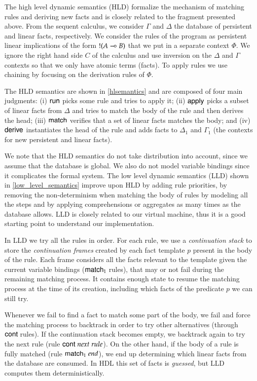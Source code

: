 The high level dynamic semantics (HLD) formalize the mechanism of matching rules and deriving new facts and is closely related to the fragment presented above.
From the sequent calculus, we consider $\Gamma$ and $\Delta$ the database of persistent and linear facts, respectively.
We consider the rules of the program as persistent linear implications of the form ${!} (A \multimap B)$ that we put in a separate context $\Phi$.
We ignore the right hand side $C$ of the calculus and use inversion on the $\Delta$ and $\Gamma$ contexts so that we only have atomic terms (facts). To apply rules
we use chaining by focusing on the derivation rules of $\Phi$.

The HLD semantics are shown in \ref{hlsemantics} and are composed of four main judgments: (i) $\mathsf{run}$ picks some rule and tries to apply it;
(ii) $\mathsf{apply}$ picks a subset of linear facts from $\Delta$ and tries to match the body of the rule and then derives the head; (iii) $\mathsf{match}$
verifies that a set of linear facts matches the body; and (iv) $\mathsf{derive}$ instantiates the head of the rule and adds facts to $\Delta_1$ and $\Gamma_1$
(the contexts for new persistent and linear facts).

We note that the HLD semantics do not take distribution into account, since we assume that the database is global. We also do not model variable bindings
since it complicates the formal system. The low level dynamic semantics (LLD) shown in \ref{low_level_semantics} improve upon HLD by adding rule priorities, by removing the non-determinism
when matching the body of rules by modeling all the steps and by applying comprehensions or aggregates as many times as the database allows.
LLD is closely related to our virtual machine, thus it is a good starting point to understand our implementation.

In LLD we try all the rules in order. For each rule, we use a \emph{continuation stack} to store the \emph{continuation frames} created by each fact template $p$ present
in the body of the rule. Each frame considers all the facts relevant to the template given the current variable bindings ($\mathsf{match}_1 \;$rules), that may or not fail during the
remaining matching process. It contains enough state to resume the matching process at the time of its creation, including which facts of the predicate $p$
we can still try.

Whenever we fail to find a fact to match some part of the body, we fail and force the matching process to backtrack in order to try other alternatives (through $\mathsf{cont} \;$rules).
If the continuation stack becomes empty, we backtrack again to try the next rule (rule $\mathsf{cont} \; next \; rule$). On the other hand, if the body of a rule is fully matched (rule $\mathsf{match}_1 \; end$),
we end up determining which linear facts from the database are consumed. In HDL this set of facts is \emph{guessed}, but LLD computes them deterministically.

